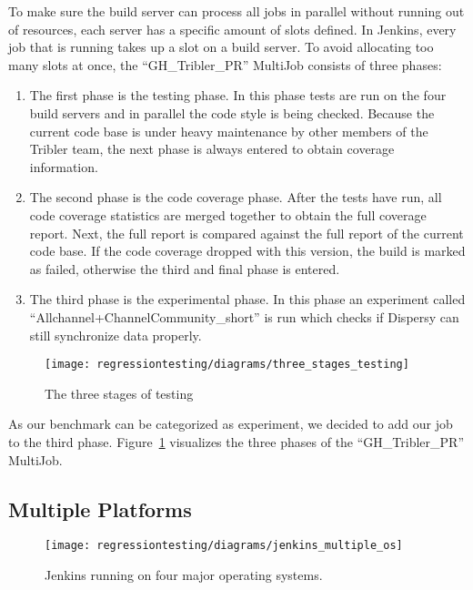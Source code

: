 To make sure the build server can process all jobs in parallel without running out of resources, each server has a specific amount of slots defined.
In Jenkins, every job that is running takes up a slot on a build server.
To avoid allocating too many slots at once, the \enquote{GH\_Tribler\_PR} MultiJob consists of three phases:

\begin{enumerate}
	\item The first phase is the testing phase. In this phase tests are run on the four build servers and in parallel the code style is being checked. Because the current code base is under heavy maintenance by other members of the Tribler team, the next phase is always entered to obtain coverage information.
	\item The second phase is the code coverage phase. After the tests have run, all code coverage statistics are merged together to obtain the full coverage report. Next, the full report is compared against the full report of the current code base. If the code coverage dropped with this version, the build is marked as failed, otherwise the third and final phase is entered.
	\item The third phase is the experimental phase. In this phase an experiment called \enquote{Allchannel+ChannelCommunity\_short} is run which checks if Dispersy can still synchronize data properly.
\end{enumerate}

\begin{figure}[!h]
	\centering
	\texttt{[image: regressiontesting/diagrams/three\_stages\_testing]}
	\caption{The three stages of testing}
	\label{fig:three_stages_of_testing}
\end{figure} 

As our benchmark can be categorized as experiment, we decided to add our job to the third phase.
Figure~\ref{fig:three_stages_of_testing} visualizes the three phases of the \enquote{GH\_Tribler\_PR} MultiJob.

\subsection{Multiple Platforms}

\begin{figure}[!h]
	\centering
	\texttt{[image: regressiontesting/diagrams/jenkins\_multiple\_os]}
	\caption{Jenkins running on four major operating systems.}
	\label{fig:jenkins_multiple_os}
\end{figure} 

